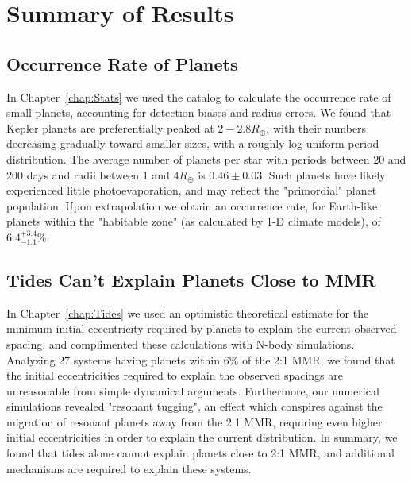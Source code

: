 \section{Summary of Results}
\subsection{Occurrence Rate of \kep Planets}
In Chapter~\ref{chap:Stats} we used the \citet{Ramirez2014} \kep catalog to calculate the occurrence rate of small planets, accounting for detection biases and radius errors. 
We found that Kepler planets are preferentially peaked at $2-2.8R_\oplus$, with their numbers decreasing gradually toward smaller sizes, with a roughly log-uniform period distribution.
The average number of planets per star with periods between $20$ and $200$ days and radii between $1$ and $4R_\oplus$ is $0.46 \pm 0.03$. 
Such planets have likely experienced little photoevaporation, and may reflect the "primordial" planet population. 
Upon extrapolation we obtain an occurrence rate, for Earth-like planets within the "habitable zone" (as calculated by 1-D climate models), of $6.4^{+3.4}_{-1.1}\%$. 

\subsection{Tides Can't Explain Planets Close to MMR}
In Chapter~\ref{chap:Tides} we used an optimistic theoretical estimate for the minimum initial eccentricity required by \kep planets to explain the current observed spacing, and complimented these calculations with N-body simulations.
Analyzing 27 \kep systems having planets within $6\%$ of the 2:1 MMR, we found that the initial eccentricities required to explain the observed spacings are unreasonable from simple dynamical arguments.
Furthermore, our numerical simulations revealed "resonant tugging", an effect which conspires against the migration of resonant planets away from the 2:1 MMR, requiring even higher initial eccentricities in order to explain the current \kep distribution. 
In summary, we found that tides alone cannot explain planets close to 2:1 MMR, and additional mechanisms are required to explain these systems. 

